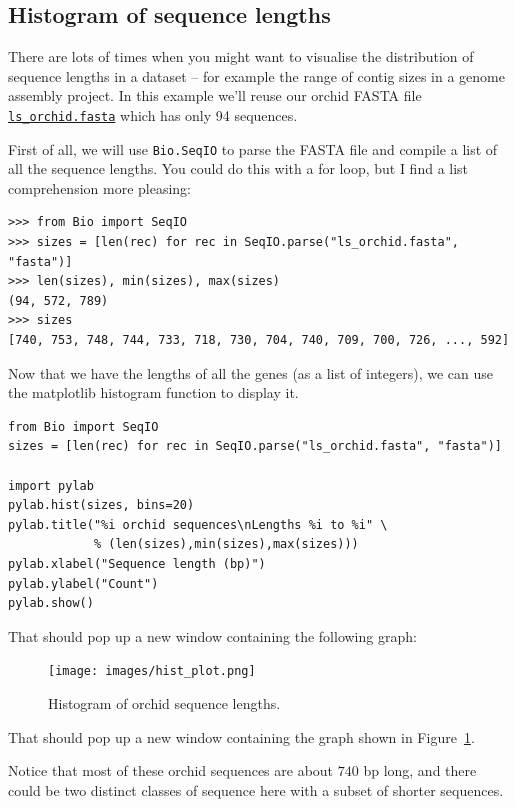 \documentclass{report}
\begin{document}
\subsection{Histogram of sequence lengths}

There are lots of times when you might want to visualise the distribution of sequence
lengths in a dataset -- for example the range of contig sizes in a genome assembly
project.  In this example we'll reuse our orchid FASTA file \href{http://biopython.org/DIST/docs/tutorial/examples/ls_orchid.fasta}{\tt ls\_orchid.fasta} which has only 94 sequences.

First of all, we will use \verb|Bio.SeqIO| to parse the FASTA file and compile a list
of all the sequence lengths.  You could do this with a for loop, but I find a list
comprehension more pleasing:

\begin{verbatim}
>>> from Bio import SeqIO
>>> sizes = [len(rec) for rec in SeqIO.parse("ls_orchid.fasta", "fasta")]
>>> len(sizes), min(sizes), max(sizes)
(94, 572, 789)
>>> sizes
[740, 753, 748, 744, 733, 718, 730, 704, 740, 709, 700, 726, ..., 592]
\end{verbatim}

Now that we have the lengths of all the genes (as a list of integers), we can use the
matplotlib histogram function to display it.

\begin{verbatim}
from Bio import SeqIO
sizes = [len(rec) for rec in SeqIO.parse("ls_orchid.fasta", "fasta")]

import pylab
pylab.hist(sizes, bins=20)
pylab.title("%i orchid sequences\nLengths %i to %i" \
            % (len(sizes),min(sizes),max(sizes)))
pylab.xlabel("Sequence length (bp)")
pylab.ylabel("Count")
pylab.show()
\end{verbatim}

%
%
\begin{htmlonly}
\noindent That should pop up a new window containing the following graph:


\end{htmlonly}
%
%
\begin{latexonly}
\begin{figure}[htbp]
\centering
\texttt{[image: images/hist\_plot.png]}
\caption{Histogram of orchid sequence lengths.}
\label{fig:seq-len-hist}
\end{figure}
\noindent That should pop up a new window containing the graph
shown in Figure~\ref{fig:seq-len-hist}.
\end{latexonly}
%
%
Notice that most of these orchid sequences are about $740$ bp long, and there could be
two distinct classes of sequence here with a subset of shorter sequences.
\end{document}
